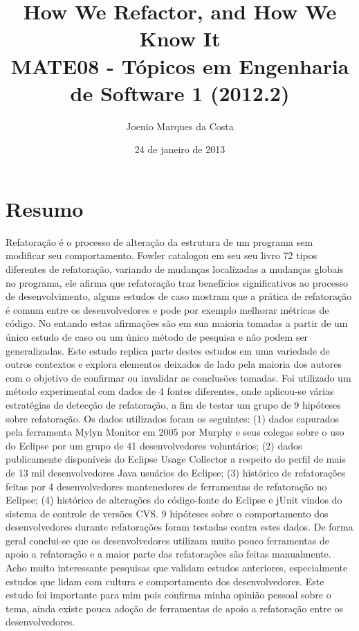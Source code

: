 \documentclass[12pt]{article}
\title{How We Refactor, and How We Know It\cite{HowWeRefactor} \\
 \large MATE08 - Tópicos em Engenharia de Software 1 (2012.2)}
\author{Joenio Marques da Costa}
\date{24 de janeiro de 2013}
\begin{document}
\maketitle

\section*{Resumo}

Refatoração é o processo de alteração da estrutura de um programa sem modificar
seu comportamento. Fowler catalogou em seu seu livro 72 tipos diferentes de
refatoração, variando de mudanças localizadas a mudanças globais no programa,
ele afirma que refatoração traz benefícios significativos ao processo de
desenvolvimento, alguns estudos de caso mostram que a prática de refatoração é
comum entre os desenvolvedores e pode por exemplo melhorar métricas de código.
No entando estas afirmações são em sua maioria tomadas a partir de um único
estudo de caso ou um único método de pesquisa e não podem ser generalizadas.
Este estudo replica parte destes estudos em uma variedade de outros contextos e
explora elementos deixados de lado pela maioria dos autores com o objetivo de
confirmar ou invalidar as conclusões tomadas. Foi utilizado um método
experimental com dados de 4 fontes diferentes, onde aplicou-se várias
estratégias de detecção de refatoração, a fim de testar um grupo de 9 hipóteses
sobre refatoração. Os dados utilizados foram os seguintes: (1) dados capurados
pela ferramenta Mylyn Monitor em 2005 por Murphy e seus colegas sobre o uso do
Eclipse por um grupo de 41 desenvolvedores voluntários; (2) dados publicamente
disponíveis do Eclipse Usage Collector a respeito do perfil de mais de 13 mil
desenvolvedores Java usuários do Eclipse; (3) histórico de refatorações feitas
por 4 desenvolvedores mantenedores de ferramentas de refatoração no Eclipse;
(4) histórico de alterações do código-fonte do Eclipse e jUnit vindos do
sistema de controle de versões CVS. 9 hipóteses sobre o comportamento dos
desenvolvedores durante refatorações foram testadas contra estes dados. De
forma geral conclui-se que os desenvolvedores utilizam muito pouco ferramentas
de apoio a refatoração e a maior parte das refatorações são feitas manualmente.
Acho muito interessante pesquisas que validam estudos anteriores, especialmente
estudos que lidam com cultura e comportamento dos desenvolvedores. Este estudo
foi importante para mim pois confirma minha opinião pessoal sobre o tema, ainda
existe pouca adoção de ferramentas de apoio a refatoração entre os
desenvolvedores.


\end{document}
